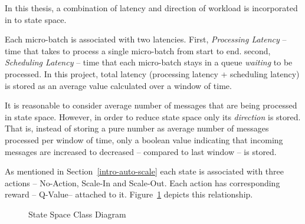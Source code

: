 In this thesis, a combination of latency and direction of workload is incorporated in to state space.
\begin{description}[leftmargin=0pt]
    \item[Latency] Each micro-batch is associated with two latencies. First, \emph{Processing Latency} -- time that takes to process a single micro-batch from start to end. second, \emph{Scheduling Latency} -- time that each micro-batch stays in a queue \emph{waiting} to be processed. In this project, total latency (processing latency + scheduling latency) is stored as an average value calculated over a window of time.
    \item[Workload Direction] It is reasonable to consider average number of messages that are being processed in state space. However, in order to reduce state space only its \emph{direction} is stored. That is, instead of storing a pure number as average number of messages processed per window of time, only a boolean value indicating that incoming messages are increased to decreased -- compared to last window -- is stored.
\end{description}

As mentioned in Section~\ref{intro-auto-scale} each state is associated with three actions -- No-Action, Scale-In and Scale-Out. Each action has corresponding reward -- Q-Value-- attached to it. Figure~\ref{des:l:state-space} depicts this relationship.
\begin{figure}[h]
    \centering
    \caption{State Space Class Diagram}
    \label{des:l:state-space}
\end{figure}


